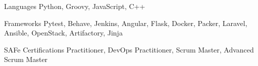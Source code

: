 
\begin{cvskills}
  \cvskill
    {Languages} %
    {Python, Groovy, JavaScript, C++} %

  \cvskill
    {Frameworks} %
    {
        Pytest,
        Behave,
        Jenkins,
        Angular,
        Flask,
        Docker,
        Packer,
        Laravel,
        Ansible,
        OpenStack,
        Artifactory,
        Jinja
    } %

  \cvskill
    {SAFe Certifications}
    {Practitioner, DevOps Practitioner, Scrum Master, Advanced Scrum Master}

\end{cvskills}
